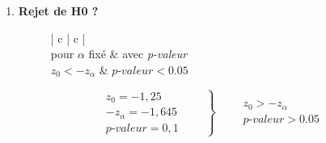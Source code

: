 \begin{enumerate}
        \begin{equation}
            \textit{p-valeur} = erf(t_{0}) 
            \label{eq:p-valeur_test_norm_var_inconnue}
        \end{equation}

        \vspace{.2cm}

\begin{lstlisting}[style=myPython, caption=Code Python question 1, frame=lines]
n = 100
p0 = .2
p = 15/n
ic = 95
alpha = 1 - ic / 100
z = stats.norm.ppf(1 - alpha)
z0 = (p - p0)/np.sqrt(p0*(1-p0)/n)
p_valeur = stats.norm.cdf(z0)

print("Question 1:")
print(" z:", round(z, 3))
print(" z0:", round(z0, 3))
print(" p-valeur:", p_valeur, end="\n\n")
\end{lstlisting}

\begin{lstlisting}[style=myLog, caption=Résultat du code, frame=lines]
Question 1:
 z: 1.645
 z0: -1.25
 p-valeur: 0.10564977366685518
\end{lstlisting}


    \item \textbf{Rejet de H0 ?}
        \begin{figure}[!h]
            \centering
            \begin{minipage}{.48\linewidth}
                \begin{center}
                    \begin{tabular}{| c | c |}
                        \hline
                         \\
                        pour $\alpha$ fixé & avec \textit{p-valeur} \\ \hline
                        $z_{0} < -z_{\alpha}$ & $ \textit{p-valeur} < 0.05 $\\ \hline
                    \end{tabular}
                \end{center}
            \end{minipage}\hfill\vline
            \begin{minipage}{.48\linewidth}
                \begin{equation*}
                    \left .
                    \begin{aligned}
                        z_{0} = -1,25 \\
                        -z_{\alpha} = -1,645\\
                        \textit{p-valeur} = 0,1
                    \end{aligned} \qquad
                    \right\} \qquad
                    \begin{aligned} 
                        z_{0} > -z_{\alpha}\\
                        \textit{p-valeur} > 0.05
                    \end{aligned}
                \end{equation*}
            \end{minipage}
        \end{figure}


\end{enumerate}
